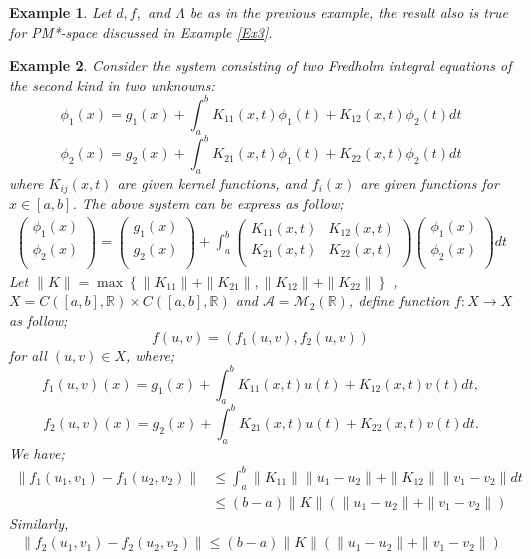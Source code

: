 \documentclass{amsart}%
\theoremstyle{plain}
\newtheorem{example}{Example}
\numberwithin{equation}{section}
\begin{document}
\begin{example}
	Let $d, f,$ and $\varLambda$ be as in the previous example, the result also is true for PM*-space discussed in Example \ref{Ex3}.  
\end{example}
\begin{example}
	Consider the system consisting of two Fredholm integral equations of the second
	kind in two unknowns:
	$$\phi_1(x)=g_1(x)+\int_{a}^{b}K_{11}(x,t)\phi_1(t)+K_{12}(x,t)\phi_2(t)dt$$
	$$\phi_2(x)=g_2(x)+\int_{a}^{b}K_{21}(x,t)\phi_1(t)+K_{22}(x,t)\phi_2(t)dt$$
	where $K_{ij}(x,t)$ are given kernel functions, and $f_i(x)$ are given functions for $x\in [a,b]$. The above system can be express as follow;
	\begin{align*}
		\left(
		\begin{array}{c}
			\phi_1(x)   \\
			\phi_2(x)  \\
		\end{array}
		\right)=
		\left(
		\begin{array}{c}
			g_1(x)   \\
			g_2(x)  \\
		\end{array}
		\right)+\int_{a}^{b}
		\left(
		\begin{array}{cc}
			K_{11}(x,t) & K_{12}(x,t)  \\
			K_{21}(x,t) & K_{22}(x,t)  \\
		\end{array}
		\right)
		\left(
		\begin{array}{c}
			\phi_1(x)   \\
			\phi_2(x)  \\
		\end{array}
		\right)dt
	\end{align*}
	Let $\|K\|=\max\left\{\|K_{11}\|+\|K_{21}\|, \|K_{12}\|+\|K_{22}\|\right\}$
	, $X=C([a,b],\mathbb{R})\times C([a,b],\mathbb{R})$ and $\mathcal{A}=\mathcal{M}_{2}(\mathbb{R})$, define function $f: X \to X$ as follow;
	$$f(u,v)=\left(f_1(u,v), f_2(u,v)\right)$$
	for all $(u,v)\in X$, where;
	$$f_1(u,v)(x)=g_1(x)+\int_{a}^{b}K_{11}(x,t)u(t)+K_{12}(x,t)v(t)dt,$$  $$f_2(u,v)(x)=g_2(x)+\int_{a}^{b}K_{21}(x,t)u(t)+K_{22}(x,t)v(t)dt.$$
	We have;
	\begin{align*}
		\|f_1(u_1,v_1)-f_1(u_2,v_2)\|&\leq \int_{a}^{b}\|K_{11}\|\|u_1-u_2\|+\|K_{12}\|\|v_1-v_2\|dt\\
		&\leq (b-a)\|K\|\left(\|u_1-u_2\|+\|v_1-v_2\|\right)
	\end{align*}
	Similarly,
	\begin{align*}
		\|f_2(u_1,v_1)-f_2(u_2,v_2)\|\leq (b-a)\|K\|\left(\|u_1-u_2\|+\|v_1-v_2\|\right)
	\end{align*}
	

\end{example}
\end{document}
